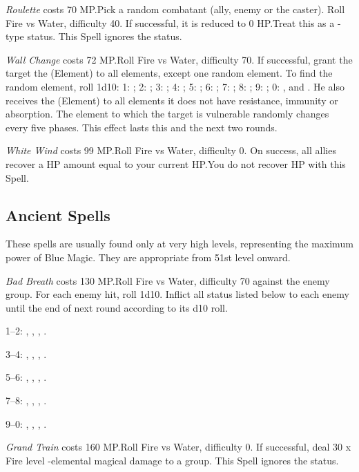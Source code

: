 \begin{multicols}{2}
    \textit{Roulette} costs 70 MP.\@{}Pick a random combatant (ally, enemy or the caster). Roll Fire vs Water, difficulty 40. If successful, it is reduced to 0 HP.\@{}Treat this as a -type status. This Spell ignores the  status.
    
	\textit{Wall Change} costs 72 MP.\@{}Roll Fire vs Water, difficulty 70. If successful, grant the target the (Element)  to all elements, except one random element. To find the random element, roll 1d10: 1: ; 2: ; 3: ; 4: ; 5: ; 6: ; 7: ; 8: ; 9: ; 0: ,  and . He also receives the (Element)  to all elements it does not have resistance, immunity or absorption. The element to which the target is vulnerable randomly changes every five phases. This effect lasts this and the next two rounds.
    
    \textit{White Wind} costs 99 MP.\@{}Roll Fire vs Water, difficulty 0. On success, all allies recover a HP amount equal to your current HP.\@{}You do not recover HP with this Spell.

\subsection{Ancient Spells}\label{subsec:blue-ancient}

	These spells are usually found only at very high levels, representing the maximum power of Blue Magic. They are appropriate from 51st level onward.
    
    \textit{Bad Breath} costs 130 MP.\@{}Roll Fire vs Water, difficulty 70 against the enemy group. For each enemy hit, roll 1d10. Inflict all status listed below to each enemy until the end of next round according to its d10 roll.

1--2: , , , .

3--4: , , , .

5--6: , , , .

7--8: , , , .

9--0: , , , .

    \textit{Grand Train} costs 160 MP.\@{}Roll Fire vs Water, difficulty 0. If successful, deal 30 x Fire level -elemental magical damage to a group. This Spell ignores the  status.
    

\end{multicols}
